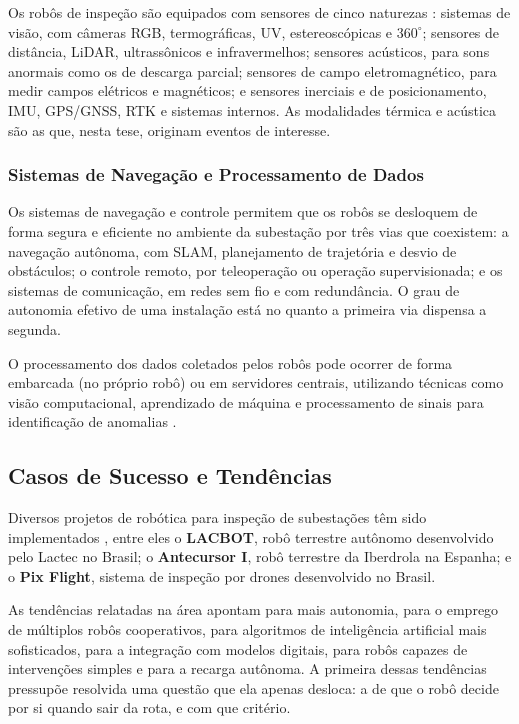 Os robôs de inspeção são equipados com sensores de cinco naturezas
\cite{Lactec2022, Iberdrola2022}: sistemas de visão, com câmeras RGB, termográficas, UV,
estereoscópicas e $360^\circ$; sensores de distância, LiDAR, ultrassônicos e
infravermelhos; sensores acústicos, para sons anormais como os de descarga parcial;
sensores de campo eletromagnético, para medir campos elétricos e magnéticos; e sensores
inerciais e de posicionamento, IMU, GPS/GNSS, RTK e sistemas internos. As modalidades
térmica e acústica são as que, nesta tese, originam eventos de interesse.

\subsubsection{Sistemas de Navegação e Processamento de Dados}

Os sistemas de navegação e controle permitem que os robôs se desloquem de forma segura e
eficiente no ambiente da subestação \cite{Lactec2022, Eletrobras2024} por três vias que
coexistem: a navegação autônoma, com SLAM, planejamento de trajetória e desvio de
obstáculos; o controle remoto, por teleoperação ou operação supervisionada; e os sistemas
de comunicação, em redes sem fio e com redundância. O grau de autonomia efetivo de uma
instalação está no quanto a primeira via dispensa a segunda.

O processamento dos dados coletados pelos robôs pode ocorrer de forma embarcada (no próprio robô) ou em servidores centrais, utilizando técnicas como visão computacional, aprendizado de máquina e processamento de sinais para identificação de anomalias \cite{Iberdrola2022, Lactec2022}.

\subsection{Casos de Sucesso e Tendências}

Diversos projetos de robótica para inspeção de subestações têm sido implementados
\cite{Lactec2022, Iberdrola2022}, entre eles o \textbf{LACBOT}, robô terrestre autônomo
desenvolvido pelo Lactec no Brasil; o \textbf{Antecursor I}, robô terrestre da Iberdrola
na Espanha; e o \textbf{Pix Flight}, sistema de inspeção por drones desenvolvido no
Brasil.

As tendências relatadas na área \cite{GlobalGrowthInsights2024, Wei2024Advancements}
apontam para mais autonomia, para o emprego de múltiplos robôs cooperativos, para
algoritmos de inteligência artificial mais sofisticados, para a integração com modelos
digitais, para robôs capazes de intervenções simples e para a recarga autônoma. A
primeira dessas tendências pressupõe resolvida uma questão que ela apenas desloca: a de
que o robô decide por si quando sair da rota, e com que critério.

